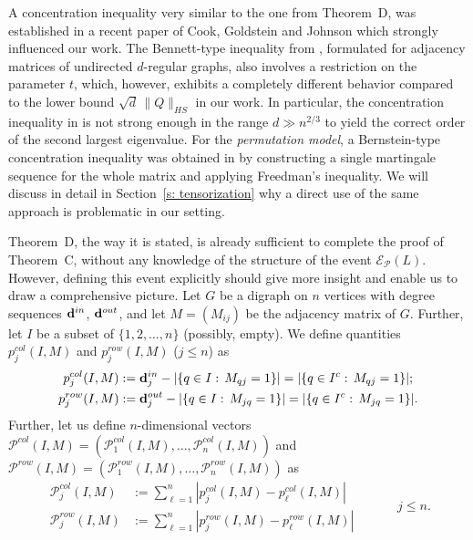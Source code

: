\documentclass[12pt]{article}
\theoremstyle{definition}
\theoremstyle{plain}
\newcommand{\Event}{\mathcal{E}}
\def\InDeg{{\bf d}^{in}}
\def\OutDeg{{\bf d}^{out}}
\def\pvector{{\mathcal P}}
\begin{document}
A concentration inequality very similar to the one from Theorem~D, was established in a recent
paper of Cook, Goldstein and Johnson \cite{CGJ} which strongly influenced our work.
The Bennett-type inequality from \cite{CGJ}, formulated for adjacency matrices of undirected $d$-regular graphs,
also involves a restriction on the parameter $t$, which, however, exhibits a completely different behavior
compared to the lower bound $\sqrt{d}\,\|Q\|_{HS}$ in our work. In particular,
the concentration inequality in \cite{CGJ} is not strong enough in the range $d\gg n^{2/3}$ to
yield the correct order of the second largest eigenvalue. For the {\it permutation model},
a Bernstein-type concentration inequality was obtained in \cite{DJPP} by constructing a single martingale
sequence for the whole matrix and applying Freedman's inequality. We will discuss in detail in Section~\ref{s: tensorization}
why a direct use of the same approach is problematic in our setting.

Theorem~D, the way it is stated, is already sufficient to complete the proof of Theorem~C,
without any knowledge of the structure of the event $\Event_\pvector(L)$.
However, defining this event explicitly should give more insight and enable us to draw a comprehensive
picture.
Let $G$ be a digraph on $n$ vertices
with degree sequences $\InDeg$, $\OutDeg$, and let $M=(M_{ij})$ be the adjacency matrix of $G$.
Further, let $I$ be a subset of $\{1,2,\dots,n\}$ (possibly, empty).
We define quantities $p_j^{col}(I,M)$ and $p_j^{row}(I,M)$ ($j\leq n$) as
\begin{align*}
p_j^{col}(I,M)&:=\InDeg_j-|\{q\in I:\,M_{qj}=1\}|=|\{q\in I^c:\,M_{qj}=1\}|;\\
p_j^{row}(I,M)&:=\OutDeg_j-|\{q\in I:\,M_{jq}=1\}|=|\{q\in I^c:\,M_{jq}=1\}|.
\end{align*}
Further, let us define $n$-dimensional vectors $\pvector^{col}(I,M)
=(\pvector^{col}_1(I,M), \ldots,\pvector^{col}_n(I,M))$ and $\pvector^{row}(I,M)
=(\pvector^{row}_1(I,M),\ldots,\pvector^{row}_n(I,M))$ as
\begin{equation*}
\begin{split}
\pvector^{col}_j(I,M)&:=\sum_{\ell=1}^n |p_j^{col}(I,M)-p_\ell^{col}(I,M)|\\
\pvector^{row}_j(I,M)&:=\sum_{\ell=1}^n |p_j^{row}(I,M)-p_\ell^{row}(I,M)|
\end{split}\quad\quad\quad j\leq n.
\end{equation*}
\end{document}
